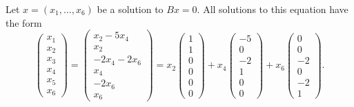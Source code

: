 \documentclass{ximera}
\begin{document}
\begin{exercise}
\begin{solution}
\soln Let $x = (x_1,\dots,x_6)$ be a solution to $Bx = 0$.  All solutions
to this equation have the form
\[
\left(\begin{array}{r} x_1 \\ x_2 \\ x_3 \\ x_4 \\ x_5 \\ x_6
\end{array}\right) =
\left(\begin{array}{c} x_2 - 5x_4 \\ x_2 \\ -2x_4 - 2x_6 \\ x_4 \\ -2x_6
\\ x_6 \end{array}\right) =
x_2\left(\begin{array}{r} 1 \\ 1 \\ 0 \\ 0 \\ 0 \\ 0 \end{array}\right) +
x_4\left(\begin{array}{r} -5 \\ 0 \\ -2 \\ 1 \\ 0 \\ 0 \end{array}\right) +
x_6\left(\begin{array}{r} 0 \\ 0 \\ -2 \\ 0 \\ -2 \\ 1 \end{array}\right).
\]


\end{solution}
\end{exercise}




\problemlabel
\end{document}
